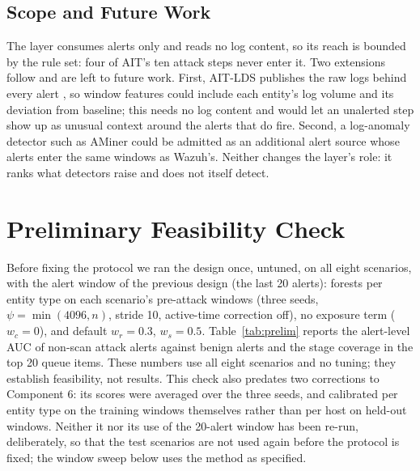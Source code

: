 \documentclass[conference]{IEEEtran}
\begin{document}
\subsection{Scope and Future Work}

The layer consumes alerts only and reads no log content, so its reach is bounded by the rule set: four of AIT's ten attack steps never enter it. Two extensions follow and are left to future work. First, AIT-LDS publishes the raw logs behind every alert \cite{ref22}, so window features could include each entity's log volume and its deviation from baseline; this needs no log content and would let an unalerted step show up as unusual context around the alerts that do fire. Second, a log-anomaly detector such as AMiner could be admitted as an additional alert source whose alerts enter the same windows as Wazuh's. Neither changes the layer's role: it ranks what detectors raise and does not itself detect.

\section{Preliminary Feasibility Check}
\label{sec:prelim}

Before fixing the protocol we ran the design once, untuned, on all eight scenarios, with the alert window of the previous design (the last 20 alerts): forests per entity type on each scenario's pre-attack windows (three seeds, $\psi = \min(4096, n)$, stride 10, active-time correction off), no exposure term ($w_c = 0$), and default $w_r = 0.3$, $w_s = 0.5$. Table~\ref{tab:prelim} reports the alert-level AUC of non-scan attack alerts against benign alerts and the stage coverage in the top 20 queue items. These numbers use all eight scenarios and no tuning; they establish feasibility, not results. This check also predates two corrections to Component 6: its scores were averaged over the three seeds, and calibrated per entity type on the training windows themselves rather than per host on held-out windows. Neither it nor its use of the 20-alert window has been re-run, deliberately, so that the test scenarios are not used again before the protocol is fixed; the window sweep below uses the method as specified.
\end{document}
